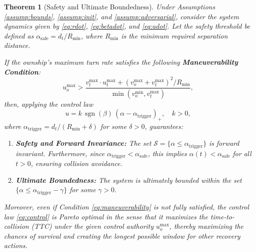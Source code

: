 \documentclass[10pt]{article}
\DeclareMathOperator{\sgn}{sgn}
\newtheorem{theorem}{Theorem}
\begin{document}
\begin{theorem}[Safety and Ultimate Boundedness]\label{thm:main}
    Under Assumptions \ref{assump:bounds}, \ref{assump:init}, and \ref{assump:adversarial}, consider the system dynamics given by \eqref{eq:rdot}, \eqref{eq:betadot}, and \eqref{eq:adot}. Let the safety threshold be defined as $\alpha_{\text{safe}} = d_t / R_{\text{min}}$, where $R_{\text{min}}$ is the minimum required separation distance.

    If the ownship's maximum turn rate satisfies the following \textbf{Maneuverability Condition}:
    \begin{equation}\label{eq:maneuverability}
        u_o^{\max} > \frac{v_t^{\max} \cdot u_t^{\max} + (v_o^{\max} + v_t^{\max})^2 / R_{\text{min}}}{\min(v_o^{\min}, v_t^{\max})},
    \end{equation}
    then, applying the control law
    \begin{equation}\label{eq:control}
        u = k \, \sgn(\beta) \, (\alpha - \alpha_{\text{trigger}})_+, \quad k > 0,
    \end{equation}
    where $\alpha_{\text{trigger}} = d_t / (R_{\text{min}} + \delta)$ for some $\delta > 0$, guarantees:
    \begin{enumerate}
        \item \textbf{Safety and Forward Invariance:} The set $\mathcal{S} = \{ \alpha \leq \alpha_{\text{trigger}} \}$ is forward invariant. Furthermore, since $\alpha_{\text{trigger}} < \alpha_{\text{safe}}$, this implies $\alpha(t) < \alpha_{\text{safe}}$ for all $t > 0$, ensuring collision avoidance.
        \item \textbf{Ultimate Boundedness:} The system is ultimately bounded within the set $\{ \alpha \leq \alpha_{\text{trigger}} - \gamma \}$ for some $\gamma > 0$.
    \end{enumerate}
    Moreover, even if Condition \eqref{eq:maneuverability} is not fully satisfied, the control law \eqref{eq:control} is Pareto optimal in the sense that it maximizes the time-to-collision (TTC) under the given control authority $u_o^{\max}$, thereby maximizing the chances of survival and creating the longest possible window for other recovery actions.
\end{theorem}
\end{document}
